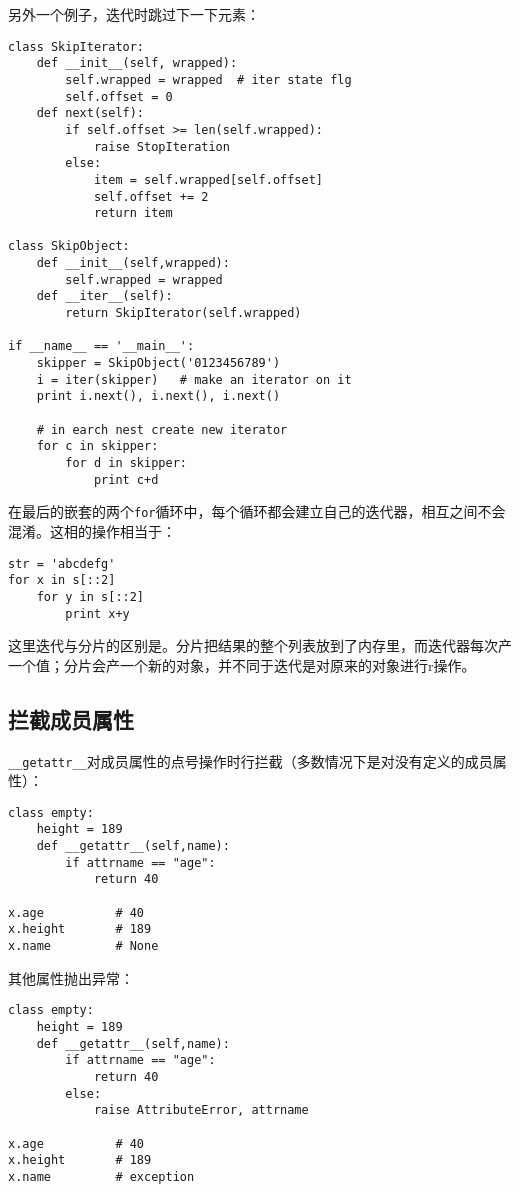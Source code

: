 另外一个例子，迭代时跳过下一下元素：

\begin{lstlisting}
class SkipIterator:
	def __init__(self, wrapped):
		self.wrapped = wrapped  # iter state flg
		self.offset = 0
	def next(self):
		if self.offset >= len(self.wrapped):
			raise StopIteration
		else:
			item = self.wrapped[self.offset]
			self.offset += 2
			return item

class SkipObject:
	def __init__(self,wrapped):
		self.wrapped = wrapped
	def __iter__(self):
		return SkipIterator(self.wrapped)

if __name__ == '__main__':
	skipper = SkipObject('0123456789')
	i = iter(skipper)   # make an iterator on it
	print i.next(), i.next(), i.next()
	
	# in earch nest create new iterator
	for c in skipper:
		for d in skipper:
			print c+d
\end{lstlisting}

在最后的嵌套的两个\verb|for|循环中，每个循环都会建立自己的迭代器，相互之间不会混淆。这相的操作相当于：

\begin{lstlisting}
str = 'abcdefg'
for x in s[::2]
	for y in s[::2]
		print x+y
\end{lstlisting}

这里迭代与分片的区别是。分片把结果的整个列表放到了内存里，而迭代器每次产一个值；分片会产一个新的对象，并不同于迭代是对原来的对象进行r操作。

\subsection{拦截成员属性}

\verb|__getattr__|对成员属性的点号操作时行拦截（多数情况下是对没有定义的成员属性）：

\begin{lstlisting}
class empty:
	height = 189
	def __getattr__(self,name):
		if attrname == "age":
			return 40

x.age          # 40
x.height       # 189
x.name         # None
\end{lstlisting}

其他属性抛出异常：

\begin{lstlisting}
class empty:
	height = 189
	def __getattr__(self,name):
		if attrname == "age":
			return 40
		else:
			raise AttributeError, attrname

x.age          # 40
x.height       # 189
x.name         # exception
\end{lstlisting}

